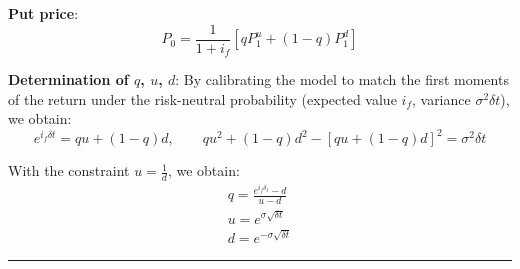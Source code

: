 \begin{f}
\textbf{Put price}:
\[
P_{0} = \frac{1}{1+i_f} \left[ q P_{1}^{u} + (1 - q) P_{1}^{d} \right]
\]

\textbf{Determination of \(q\), \(u\), \(d\)}:  
By calibrating the model to match the first moments of the return under the risk-neutral probability (expected value \(i_f\), variance \(\sigma^2 \delta t\)), we obtain:
\[
e^{i_{f} \delta t} = q u + (1-q) d, \qquad q u^2 + (1-q) d^2 - [q u + (1-q) d]^2 = \sigma^2 \delta t
\]

With the constraint \(u = \frac{1}{d}\), we obtain:
\[
\begin{array}{l}
	q = \frac{e^{i_f \delta_t} - d}{u - d} \\
	u = e^{\sigma \sqrt{\delta t}} \\
	d = e^{-\sigma \sqrt{\delta t}}
\end{array}
\]

\end{f}
\hrule

